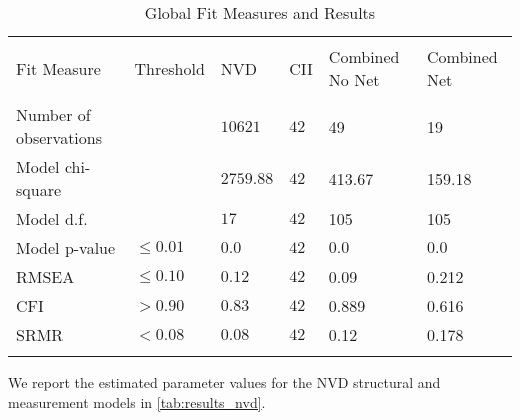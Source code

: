 \begin{table*}
	\begin{center}	
		\caption{Global Fit Measures and Results}
			\label{tab:results_fit_all}
			\begin{tabular}{p{3cm}p{1cm}|p{2cm}p{2cm}p{2cm}p{2cm}}
				\\[-1.8ex]\hline 
				\hline \\[-1.8ex] 
				Fit Measure &	Threshold & NVD	& CII	& Combined No Net  & Combined Net \\
				\hline \\[-1.8ex] 				
				Number of observations &  & $10621$ & $42$  & 49 & 19 \\				
				Model chi-square &  & $2759.88$ & $42$ & 413.67 & 159.18\\				
				Model d.f. &  & $17$ & $42$ & 105 & 105\\		
				Model p-value & $\leq 0.01$ & $0.0$ & $42$ & $0.0$ & $0.0$\\
				RMSEA & $\leq 0.10$ &  $0.12$  & $42$ & 0.09 & 0.212 \\
				CFI & $> 0.90$ & $0.83$ & $42$ & 0.889 & 0.616\\
				SRMR & $< 0.08$ & $0.08$ & $42$& 0.12  & 0.178 \\
				\hline \\[-1.8ex] 				
			\end{tabular}
	\end{center}
\end{table*}

We report the estimated parameter values for the NVD structural and measurement models in \ref{tab:results_nvd}.

